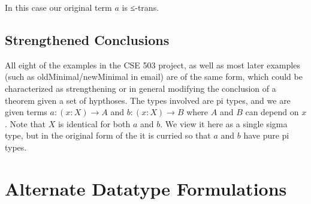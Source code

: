 \documentclass{article}
\begin{document}
In this case our original term $a$ is ≤-trans.

\subsection{Strengthened Conclusions}

All eight of the examples in the CSE 503 project, as well as most
later examples (such as oldMinimal/newMinimal in email) are of the
same form, which could be characterized as strengthening or in general
modifying the conclusion of a theorem given a set of hypthoses.  The
types involved are pi types, and we are given terms $a : (x : X) \to
A$ and $b : (x : X) \to B$ where $A$ and $B$ can depend on $x$.  Note
that $X$ is identical for both $a$ and $b$.  We view it here as a
single sigma type, but in the original form of the it is curried so
that $a$ and $b$ have pure pi types.

\section{Alternate Datatype Formulations}
\end{document}
